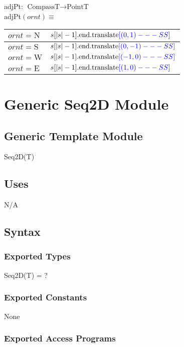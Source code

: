 \documentclass[12pt]{article}
\newcommand{\authornote}[3]{\textcolor{#1}{[#3 ---#2]}}
\newcommand{\authornote}[3]{}
\newcommand{\wss}[1]{\authornote{blue}{SS}{#1}}
\begin{document}
\noindent adjPt: $\mbox{CompassT} \rightarrow \mbox{PointT}$\\
adjPt$(ornt) \equiv$

\medskip

\begin{tabular}{|l|l|}
\hline
$ornt = \mbox{N}$ & $s[|s|-1].\mbox{end}.\mbox{translate}\wss{(0,1)}$\\
\hline
$ornt = \mbox{S}$ & $s[|s|-1].\mbox{end}.\mbox{translate}\wss{(0,-1)}$\\
\hline
$ornt = \mbox{W}$ & $s[|s|-1].\mbox{end}.\mbox{translate}\wss{(-1,0)}$\\
\hline
$ornt = \mbox{E}$ & $s[|s|-1].\mbox{end}.\mbox{translate}\wss{(1,0)}$\\
\hline
\end{tabular}

\newpage

\section* {Generic Seq2D Module}

\subsection* {Generic Template Module}

Seq2D(T)

\subsection* {Uses}

N/A

\subsection* {Syntax}

\subsubsection* {Exported Types}

Seq2D(T) = ?

\subsubsection* {Exported Constants}

None

\subsubsection* {Exported Access Programs}
\end{document}
